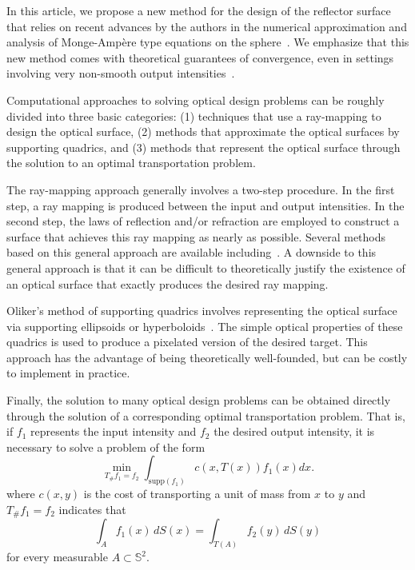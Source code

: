 \documentclass{amsart}
\newcommand{\bq}{\begin{equation}}
\newcommand{\eq}{\end{equation}}
\newcommand{\Sf}{\mathbb{S}^{2}}
\newcommand{\MA}{Monge-Amp\`ere\xspace}
\theoremstyle{lemma}
\theoremstyle{remark}
\begin{document}
In this article, we propose a new method for the design of the reflector surface that relies on recent advances by the authors in the numerical approximation and analysis of \MA type equations on the sphere~\cite{HT_OTonSphere2}.  We emphasize that this new method comes with theoretical guarantees of convergence, even in settings involving very non-smooth output intensities~\cite{HT_OTonSphere}.

Computational approaches to solving optical design problems can be roughly divided into three basic categories: (1) techniques that use a ray-mapping to design the optical surface, (2) methods that approximate the optical surfaces by supporting quadrics, and (3) methods that represent the optical surface through the solution to an optimal transportation problem.

The ray-mapping approach generally involves a two-step procedure.  In the first step, a ray mapping is produced between the input and output intensities. In the second step, the laws of reflection and/or refraction are employed to construct a surface that achieves this ray mapping as nearly as possible. Several methods based on this general approach are available including~\cite{Bruneton_lens,Desnijder_raymapping,FFL_optics,Fournier_reflector,Parkyn_lenses}.  A downside to this general approach is that it can be difficult to theoretically justify the existence of an optical surface that exactly produces the desired ray mapping.

Oliker's method of supporting quadrics involves representing the optical surface via supporting ellipsoids or hyperboloids~\cite{Oliker_nearfield,Oliker_SQM}. The simple optical properties of these quadrics is used to produce a pixelated version of the desired target.  This approach has the advantage of being theoretically well-founded, but can be costly to implement in practice.

Finally, the solution to many optical design problems can be obtained directly through the solution of a corresponding optimal transportation problem.  That is, if $f_1$ represents the input intensity and $f_2$ the desired output intensity, it is necessary to solve a problem of the form
\bq\label{eq:OT}
\min\limits_{T_\# f_1 = f_2} \int_{\text{supp}(f_1)} c(x,T(x)) f_1(x) dx.
\eq
where $c(x,y)$ is the cost of transporting a unit of mass from $x$ to $y$ and $T_\# f_1 = f_2$ indicates that
\bq\label{eq:massCons} \int_A f_1(x)\,dS(x) = \int_{T(A)} f_2(y)\,dS(y) \eq
for every measurable $A \subset \Sf$.
\end{document}
